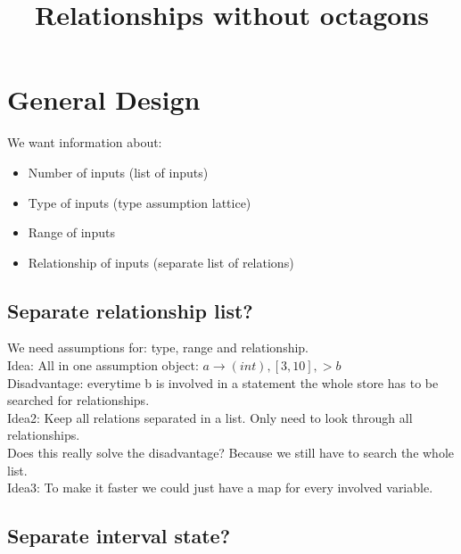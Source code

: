 \documentclass[11pt]{article}
\begin{document}
\title{Relationships without octagons}

\maketitle


\section{General Design}

We want information about:
\begin{itemize}
    \item Number of inputs (list of inputs)
    \item Type of inputs (type assumption lattice)
    \item Range of inputs
    \item Relationship of inputs (separate list of relations)
\end{itemize}

\subsection{Separate relationship list?}

We need assumptions for: type, range and relationship.\\
Idea: All in one assumption object: $a \rightarrow (int), [3, 10], > b$\\
Disadvantage: everytime b is involved in a statement the whole store has to be searched for relationships.\\
Idea2: Keep all relations separated in a list. Only need to look through all relationships.\\
Does this really solve the disadvantage? Because we still have to search the whole list.\\
Idea3: To make it faster we could just have a map for every involved variable.\\

\subsection{Separate interval state?}
\end{document}
